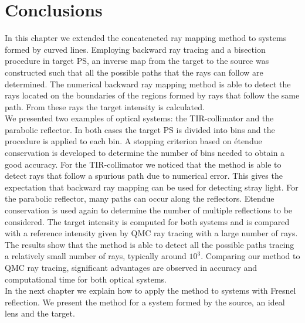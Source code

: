 \section{Conclusions}
In this chapter we extended the concateneted ray mapping method to systems formed by curved lines. Employing backward ray tracing and a bisection procedure in target PS, an inverse map from the target to the source was constructed such that all the possible paths that the rays can follow are determined. The numerical backward ray mapping method is able to detect the rays located on the boundaries of the regions formed by rays that follow the same path. From these rays the target intensity is calculated. 
\\ \indent
We presented two examples of optical systems: the TIR-collimator and the parabolic reflector. In both cases the target PS is divided into bins and the procedure is applied to each bin. A stopping criterion based on \'{e}tendue conservation is developed to determine the number of bins needed to obtain a good accuracy. For the TIR-collimator we noticed that the method is able to detect rays that follow a spurious path due to numerical error. This gives the expectation that backward ray mapping can be used for detecting stray light.
For the parabolic reflector, many paths can occur along the reflectors. Etendue conservation is used again to determine the number of multiple reflections to be considered. The target intensity is computed for both systems and is compared with a reference intensity given by QMC ray tracing with a large number of rays. The results show that the method is able to detect all the possible paths tracing a relatively small number of rays, typically around $10^3$. Comparing our method to QMC ray tracing, significant advantages are observed in accuracy and computational time for both optical systems.
\\ \indent In the next chapter we explain how to apply the method to systems with Fresnel reflection. We present the method for a system formed by the source, an ideal lens and the target. 













